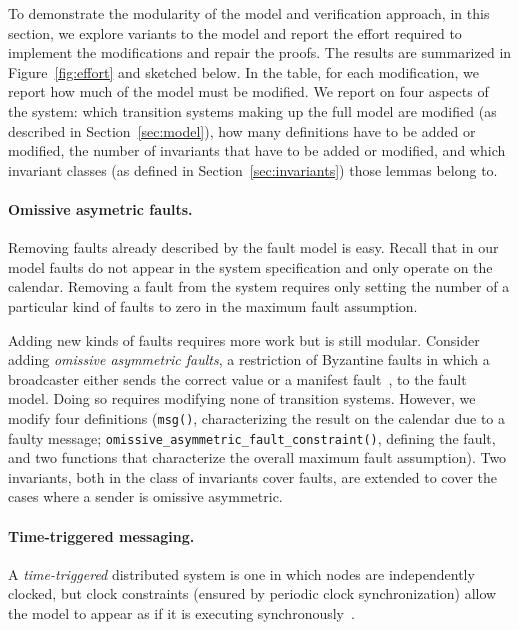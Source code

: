 \documentclass{llncs/llncs}
\newcommand{\lee}[1]{ } %
\newcommand{\lee}[1]{ {\color{blue}$<$lee: #1$>$} } %
\begin{document}
\lee{Ben: add fault-model removed plus mid-value selection models}

To demonstrate the modularity of the model and verification approach, in this section, we explore variants to the model and report the effort required to implement the modifications and repair the proofs. The results are summarized in Figure~\ref{fig:effort} and sketched below. In the table, for each modification, we report how much of the model must be modified. We report on four aspects of the system: which transition systems making up the full model are modified (as described in Section~\ref{sec:model}), how many definitions have to be added or modified, the number of invariants that have to be added or modified, and which invariant classes (as defined in Section~\ref{sec:invariants}) those lemmas belong to.

\paragraph{Omissive asymetric faults.}
Removing faults already described by the fault model is easy. Recall that in our model faults do not appear in the system specification and only operate on the calendar. Removing a fault from the system requires only setting the number of a particular kind of faults to zero in the maximum fault assumption.

Adding new kinds of faults requires more work but is still modular. Consider adding \emph{omissive asymmetric faults}, a restriction of Byzantine faults in which a broadcaster either sends the correct value or a manifest fault~\cite{}, to the fault model. Doing so requires modifying none of transition systems. However, we modify four definitions (\texttt{msg()}, characterizing the result on the calendar due to a faulty message; \texttt{omissive\_asymmetric\_fault\_constraint()}, defining the fault, and two functions that characterize the overall maximum fault assumption). Two invariants, both in the class of invariants cover faults, are extended to cover the cases where a sender is omissive asymmetric.

\paragraph{Time-triggered messaging.}
A \emph{time-triggered} distributed system is one in which nodes are independently clocked, but clock constraints (ensured by periodic clock synchronization) allow the model to appear as if it is executing synchronously~\cite{}.
\end{document}

